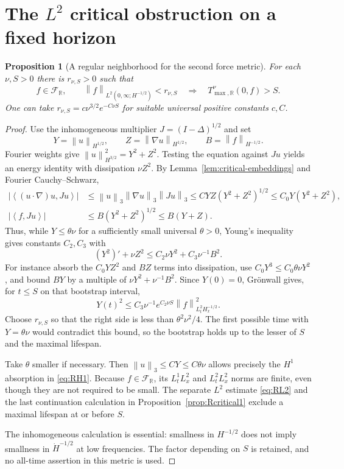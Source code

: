 \documentclass[11pt,a4paper]{article}
\newtheorem{proposition}[theorem]{Proposition}
\theoremstyle{definition}\newtheorem{definition}[theorem]{Definition}
\theoremstyle{remark}\newtheorem{remark}[theorem]{Remark}
\newcommand{\R}{\mathbb R}\newcommand{\TT}{\mathbb T^3}
\newcommand{\norm}[1]{\left\lVert#1\right\rVert}
\newcommand{\ip}[2]{\left\langle#1,#2\right\rangle}
\begin{document}
\section{The \texorpdfstring{$L^2$}{L2} critical obstruction on a fixed horizon}
\begin{proposition}[A regular neighborhood for the second force metric]\label{prop:Rcritical2}
For each $\nu,S>0$ there is $r_{\nu,S}>0$ such that
\[
 f\in\mathcal F_{\R},\qquad
 \norm{f}_{L^2(0,\infty;H^{-1/2})}<r_{\nu,S}
 \quad\Longrightarrow\quad T^\nu_{\max,\R}(0,f)>S.
\]
One can take $r_{\nu,S}=c\nu^{3/2}e^{-C\nu S}$ for suitable universal positive constants $c,C$.
\end{proposition}
\begin{proof}
Use the inhomogeneous multiplier $J=(I-\Delta)^{1/2}$ and set
\[
 Y=\norm{u}_{H^{1/2}},\qquad
 Z=\norm{\nabla u}_{H^{1/2}},\qquad
 B=\norm{f}_{H^{-1/2}}.
\]
Fourier weights give $\norm{u}_{H^{3/2}}^2=Y^2+Z^2$. Testing the equation against $Ju$ yields an energy identity with dissipation $\nu Z^2$. By Lemma~\ref{lem:critical-embeddings} and Fourier Cauchy--Schwarz,
\begin{align*}
 |\ip{(u\cdot\nabla)u}{Ju}|
 &\le\norm{u}_3\norm{\nabla u}_3\norm{Ju}_3
 \le C Y Z(Y^2+Z^2)^{1/2}
 \le C_0Y(Y^2+Z^2),\\
 |\ip{f}{Ju}|&\le B(Y^2+Z^2)^{1/2}\le B(Y+Z).
\end{align*}
Thus, while $Y\le\theta\nu$ for a sufficiently small universal $\theta>0$, Young's inequality gives constants $C_2,C_3$ with
\begin{equation}\label{eq:Rcritical2}
 (Y^2)'+\nu Z^2\le C_2\nu Y^2+C_3\nu^{-1}B^2.
\end{equation}
For instance absorb the $C_0YZ^2$ and $BZ$ terms into dissipation, use $C_0Y^3\le C_0\theta\nu Y^2$, and bound $BY$ by a multiple of $\nu Y^2+\nu^{-1}B^2$. Since $Y(0)=0$, Gr\"onwall gives, for $t\le S$ on that bootstrap interval,
\[
 Y(t)^2\le C_3\nu^{-1}e^{C_2\nu S}
            \norm{f}_{L^2_tH^{-1/2}_x}^2.
\]
Choose $r_{\nu,S}$ so that the right side is less than $\theta^2\nu^2/4$. The first possible time with $Y=\theta\nu$ would contradict this bound, so the bootstrap holds up to the lesser of $S$ and the maximal lifespan.

Take $\theta$ smaller if necessary. Then $\norm{u}_3\le CY\le C\theta\nu$ allows precisely the $H^1$ absorption in \eqref{eq:RH1}. Because $f\in\mathcal F_{\R}$, its $L^1_tL^2_x$ and $L^2_tL^2_x$ norms are finite, even though they are not required to be small. The separate $L^2$ estimate \eqref{eq:RL2} and the last continuation calculation in Proposition~\ref{prop:Rcritical1} exclude a maximal lifespan at or before $S$.

The inhomogeneous calculation is essential: smallness in $H^{-1/2}$ does not imply smallness in $\dot H^{-1/2}$ at low frequencies. The factor depending on $S$ is retained, and no all-time assertion in this metric is used.
\end{proof}
\end{document}
